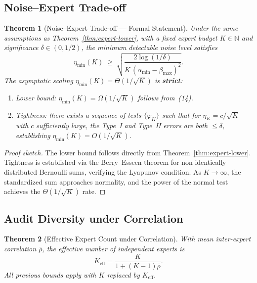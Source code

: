 \documentclass[12pt,a4paper]{article}
\newtheorem{theorem}{Theorem}[section]
\newcommand{\etamin}{\eta_{\min}}
\newcommand{\rhobar}{\bar{\rho}}
\begin{document}
\subsection{Noise--Expert Trade-off}

\begin{theorem}[Noise--Expert Trade-off --- Formal Statement]
\label{thm:noise-expert}
Under the same assumptions as Theorem~\ref{thm:expert-lower}, with a fixed
expert budget $K\in\mathbb{N}$ and significance $\delta\in(0,1/2)$, the minimum
detectable noise level satisfies
\begin{equation}\label{eq:eta-min}
    \etamin(K) \;\geq\;
    \sqrt{\frac{2\log(1/\delta)}
               {K\,(\alpha_{\min}-\beta_{\max})^{2}}}.
\end{equation}
The asymptotic scaling $\etamin(K)=\Theta(1/\sqrt{K})$ is \textbf{strict}:
\begin{enumerate}[label=(\roman*)]
    \item \emph{Lower bound:} $\etamin(K)=\Omega(1/\sqrt{K})$ follows from~(14).
    \item \emph{Tightness:} there exists a sequence of tests $\{\varphi_K\}$
          such that for $\eta_K = c/\sqrt{K}$ with $c$ sufficiently large,
          the Type~I and Type~II errors are both $\leq\delta$, establishing
          $\etamin(K)=O(1/\sqrt{K})$.
\end{enumerate}
\end{theorem}

\begin{proof}[Proof sketch]
The lower bound follows directly from Theorem~\ref{thm:expert-lower}. Tightness is established via the Berry--Esseen theorem for non-identically distributed Bernoulli sums, verifying the Lyapunov condition. As $K\to\infty$, the standardized sum approaches normality, and the power of the normal test achieves the $\Theta(1/\sqrt{K})$ rate.
\end{proof}

\subsection{Audit Diversity under Correlation}
\label{sec:diversity}

\begin{theorem}[Effective Expert Count under Correlation]
\label{thm:diversity}
With mean inter-expert correlation $\rhobar$, the effective number of independent experts is
\[
K_{\mathrm{eff}} = \frac{K}{1 + (K-1)\rhobar}.
\]
All previous bounds apply with $K$ replaced by $K_{\mathrm{eff}}$.
\end{theorem}
\end{document}

